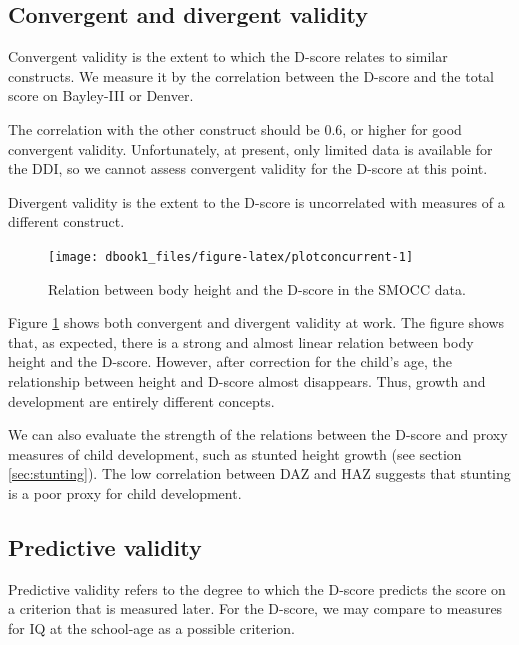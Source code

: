 \documentclass[
]{book}
\begin{document}
\hypertarget{convergent-and-divergent-validity}{%
\subsection{Convergent and divergent validity}\label{convergent-and-divergent-validity}}

Convergent validity is the extent to which the D-score relates to similar constructs. We measure it by the correlation between the D-score and the total score on Bayley-III or Denver.

The correlation with the other construct should be 0.6, or higher for good convergent validity. Unfortunately, at present, only limited data is available for the DDI, so we cannot assess convergent validity for the D-score at this point.

Divergent validity is the extent to the D-score is uncorrelated with measures of a different construct.

\begin{figure}

{\centering \texttt{[image: dbook1\_files/figure-latex/plotconcurrent-1]} 

}

\caption{Relation between body height and the D-score in the SMOCC data.}\label{fig:plotconcurrent}
\end{figure}



Figure \ref{fig:plotconcurrent} shows both convergent and divergent validity at work. The figure shows that, as expected, there is a strong and almost linear relation between body height and the D-score. However, after correction for the child's age, the relationship between height and D-score almost disappears. Thus, growth and development are entirely different concepts.

We can also evaluate the strength of the relations between the D-score and proxy measures of child development, such as stunted height growth (see section \ref{sec:stunting}). The low correlation between DAZ and HAZ suggests that stunting is a poor proxy for child development.

\hypertarget{predictive-validity}{%
\subsection{Predictive validity}\label{predictive-validity}}

Predictive validity refers to the degree to which the D-score predicts the score on a criterion that is measured later. For the D-score, we may compare to measures for IQ at the school-age as a possible criterion.
\end{document}
